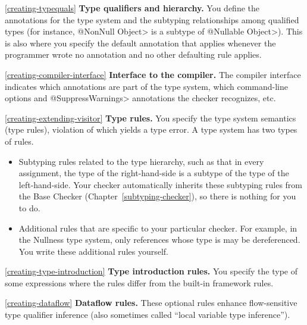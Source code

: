 \begin{description}

\item{\ref{creating-typequals}}
  \textbf{Type qualifiers and hierarchy.}  You define the annotations for
  the type system and the subtyping relationships among qualified types
  (for instance, \<@NonNull Object> is a subtype of \<@Nullable
  Object>).  This is also where you specify the default annotation that
  applies whenever the programmer wrote no annotation and no other defaulting
  rule applies.

\item{\ref{creating-compiler-interface}}
  \textbf{Interface to the compiler.}  The compiler interface indicates
  which annotations are part of the type system, which command-line options
  and \<@SuppressWarnings> annotations the checker recognizes, etc.

\item{\ref{creating-extending-visitor}}
  \textbf{Type rules.}  You specify the type system semantics (type
  rules), violation of which yields a type error.  A type system has two types of
  rules.
\begin{itemize}
\item
  Subtyping rules related to the type hierarchy, such as that in every
  assignment,
  the type of the right-hand-side is a subtype of the type of the left-hand-side.
  Your checker automatically inherits these subtyping rules from the Base
  Checker (Chapter~\ref{subtyping-checker}), so there is nothing for you to do.
\item
  Additional rules that are specific to your particular checker.  For
  example, in the Nullness type system, only references whose type is
   may be dereferenced.  You
  write these additional rules yourself.
\end{itemize}

\item{\ref{creating-type-introduction}}
  \textbf{Type introduction rules.}  You specify the type of some expressions where
  the rules differ from the built-in framework rules.

\item{\ref{creating-dataflow}}
  \textbf{Dataflow rules.}  These optional rules enhance flow-sensitive
  type qualifier inference (also sometimes called ``local variable type inference'').
\end{description}




